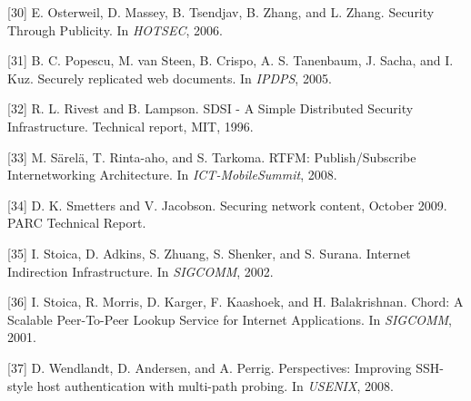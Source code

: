 [30] E. Osterweil, D. Massey, B. Tsendjav, B. Zhang, and
L. Zhang. Security Through Publicity. In \emph{HOTSEC}, 2006.

[31] B. C. Popescu, M. van Steen, B. Crispo, A. S. Tanenbaum,
J. Sacha, and I. Kuz. Securely replicated web documents. In
\emph{IPDPS}, 2005.

[32] R. L. Rivest and B. Lampson. SDSI - A Simple Distributed
Security Infrastructure. Technical report, MIT, 1996.

[33] M. Särelä, T. Rinta-aho, and S. Tarkoma. RTFM:
Publish/Subscribe Internetworking Architecture. In
\emph{ICT-MobileSummit}, 2008.

[34] D. K. Smetters and V. Jacobson. Securing network content,
October 2009. PARC Technical Report.

[35] I. Stoica, D. Adkins, S. Zhuang, S. Shenker, and S. Surana.
Internet Indirection Infrastructure. In \emph{SIGCOMM}, 2002.

[36] I. Stoica, R. Morris, D. Karger, F. Kaashoek, and
H. Balakrishnan. Chord: A Scalable Peer-To-Peer Lookup
Service for Internet Applications. In \emph{SIGCOMM}, 2001.

[37] D. Wendlandt, D. Andersen, and A. Perrig. Perspectives: Improving SSH-style host authentication with multi-path
probing. In \emph{USENIX}, 2008.